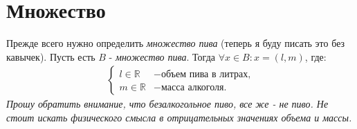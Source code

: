 \section*{Множество}
Прежде всего нужно определить \textit{множество пива} (теперь я буду писать это без кавычек).
Пусть есть $B$ - \textit{множество пива}. Тогда $\forall x \in B: x = (l, m)$, где:
\begin{align}
  \begin{cases}
    l \in \mathbb{R} & - \text{объем пива в литрах,} \\
    m \in \mathbb{R} & - \text{масса алкоголя.}
  \end{cases}
  \label{set_def}
\end{align}
\textit{Прошу обратить внимание, что безалкогольное пиво, все же - не пиво. Не стоит искать физического смысла в отрицательных значениях объема и массы.}